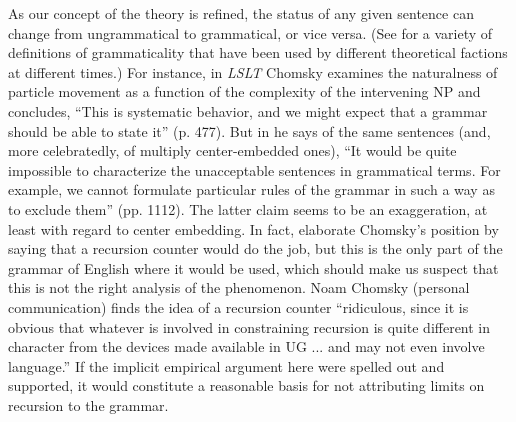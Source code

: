 As our concept of the theory is refined, the status of any given sentence can change from ungrammatical to grammatical, or vice versa. (See \citet{McCawley1979} for a variety of definitions of grammaticality that have been used by different theoretical factions at different times.) For instance, in \textit{LSLT} Chomsky examines the naturalness of particle movement as a function of the complexity of the intervening NP and concludes, ``This is systematic behavior, and we might expect that a grammar should be able to state it'' (p. 477). But in \citet{Aspects} he says of the same sentences (and, more celebratedly, of multiply center-embedded ones), ``It would be quite impossible to characterize the unacceptable sentences in grammatical terms. For example, we cannot formulate particular rules of the grammar in such a way as to exclude them'' (pp. 11\textendash{}12). The latter claim seems to be an exaggeration, at least with regard to center embedding. In fact, \citet{KatzEtAl1976} elaborate Chomsky's position by saying that a recursion counter would do the job, but this is the only part of the grammar of English where it would be used, which should make us suspect that this is not the right analysis of the phenomenon. Noam Chomsky (personal communication) finds the idea of a recursion counter ``ridiculous, since it is obvious that whatever is involved in constraining recursion is quite different in character from the devices made available in UG ... and may not even involve language.'' If the implicit empirical argument here were spelled out and supported, it would constitute a reasonable basis for not attributing limits on recursion to the grammar.

